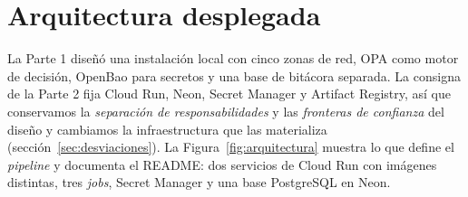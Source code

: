 \documentclass[10pt,letterpaper]{article}
\begin{document}
\section{Arquitectura desplegada}
\label{sec:arquitectura}

La Parte 1 diseñó una instalación local con cinco zonas de red, OPA como motor de decisión, OpenBao para secretos y una base de bitácora separada. La consigna de la Parte 2 fija Cloud Run, Neon, Secret Manager y Artifact Registry, así que conservamos la \emph{separación de responsabilidades} y las \emph{fronteras de confianza} del diseño y cambiamos la infraestructura que las materializa (sección~\ref{sec:desviaciones}). La Figura~\ref{fig:arquitectura} muestra lo que define el \emph{pipeline}  y documenta el README: dos servicios de Cloud Run con imágenes distintas, tres \emph{jobs}, Secret Manager y una base PostgreSQL en Neon.
\end{document}
